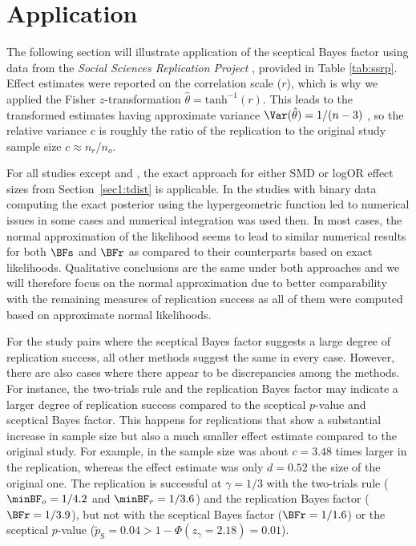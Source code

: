 \section{Application}
\label{sec1:applications}
The following section will illustrate application of the sceptical Bayes factor
using data from the \emph{Social Sciences Replication Project}
\citep{Camerer2018}, provided in Table \ref{tab:ssrp}. Effect estimates were
reported on the correlation scale ($r$), which is why we applied the Fisher
$z$-transformation $\hat{\theta} = \text{tanh}^{-1}(r)$. This leads to the
transformed estimates having approximate variance
$\Var(\hat{\theta}) = 1/(n - 3)$ \citep{Fisher1921}, so the relative variance
$c$ is roughly the ratio of the replication to the original study sample size
$c \approx n_{r}/n_{o}$.

For all studies except \citet{Janssen2010} and \citet{Derex2013}, the exact
approach for either SMD or logOR effect sizes from Section~\ref{sec1:tdist} is
applicable. In the studies with binary data
computing the exact posterior using the hypergeometric function led to numerical
issues in some cases and numerical integration was used then.
In most cases, the normal approximation of the likelihood seems to lead to
similar numerical results for both $\BFs$ and $\BFr$ as compared to their
counterparts based on exact likelihoods. Qualitative conclusions are the same
under both approaches and we will therefore focus on the normal approximation
due to better comparability with the remaining measures of replication success
as all of them were computed based on approximate normal likelihoods.


For the study pairs where the sceptical Bayes factor suggests a large degree of
replication success, all other methods suggest the same in every case. However,
there are also cases where there appear to be discrepancies among the methods.
For instance, the two-trials rule and the replication Bayes factor may indicate
a larger degree of replication success compared to the sceptical $p$-value and
sceptical Bayes factor. This happens for replications that show a substantial
increase in sample size but also a much smaller effect estimate compared to the
original study. For example, in \citet{Balafoutas2012} the sample size was about
$c = 3.48$ times larger in the replication, whereas the effect estimate was only
$d = 0.52$ the size of the original one. The replication is successful at
$\gamma = 1/3$ with the two-trials rule ($\minBF_{o} = 1/4.2$ and
$\minBF_{r} = 1/3.6$) and the replication Bayes factor ($\BFr = 1/3.9$), but not
with the sceptical Bayes factor ($\BFr = 1/1.6$) or the sceptical $p$-value
($\tilde{p}_{\mathrm{S}} = 0.04 > 1 - \Phi(z_\gamma = 2.18) = 0.01$).

